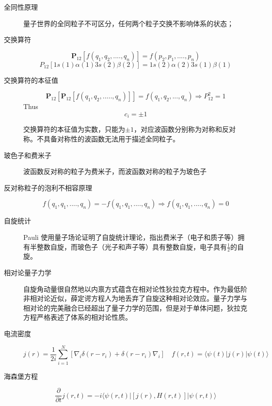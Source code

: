 \documentclass{article}
\numberwithin{equation}{section}
\newcommand{\bracketl}[3]{\langle #1 | #2 | #3 \rangle}
\newcommand{\grad}{\nabla}
\begin{document}
  \begin{description}
  	\item[全同性原理] 量子世界的全同粒子不可区分，任何两个粒子交换不影响体系的状态；

  	\item[交换算符]
  	\begin{equation}
  	\textbf{P}_{12}[f(q_1,q_2,....,q_n)]=f(p_2,p_1,....,p_n)
  	\end{equation}
  	\begin{equation}
  	P_{12}[1s(1)\alpha(1)3s(2)\beta(2)]=1s(2)\alpha(2)3s(1)\beta(1)
  	\end{equation}

  	\item[交换算符的本征值]
  	\begin{equation}
  	\textbf{P}_{12}[\textbf{P}_{12}[f(q_1,q_2,.....,q_n)]]=f(q_1,q_2,...,q_n)\Rightarrow P_{12}^2=1
  	\end{equation}
  	Thus
  	\begin{equation}
  	c_i=\pm 1
  	\end{equation}

  	交换算符的本征值为实数，只能为$\pm 1$，对应波函数分别称为对称和反对称。不具备对称性的波函数无法用于描述全同粒子。

  	\item[玻色子和费米子] 波函数反对称的粒子为费米子，而波函数对称的粒子为玻色子

  	\item[反对称粒子的泡利不相容原理]
  	\begin{equation}
  	f(q_1,q_1,....,q_n)=-f(q_1,q_1,....,q_n) \Rightarrow f(q_1,q_1,....,q_n)=0
  	\end{equation}
  	\item[自旋统计] Pauli 使用量子场论证明了自旋统计理论，指出费米子（电子和质子等）拥有半整数自旋，而玻色子（光子和声子等）具有整数自旋，电子具有$\frac{1}{2}$的自旋。

  	\item[相对论量子力学] 自旋角动量很自然地以内禀方式蕴含在相对论性狄拉克方程中。作为最低阶非相对论近似，薛定谔方程人为地丢弃了自旋这种相对论效应。量子力学与相对论的完美融合已经超出了量子力学的范围，但是对于单体问题，狄拉克方程严格表述了体系的相对论性质。
  \end{description}
  


\begin{description}
	\item[电流密度]
	\begin{equation}
	j(r)=\frac{1}{2i}\sum_{i=1}^{N}[\grad_i\delta(r-r_i)+\delta(r-r_i)\grad_i]\quad f(r,t)=\bracketl{\psi(t)}{j(r)}{\psi(t)}\end{equation}


	 \item[海森堡方程]
	 \begin{equation}
	 \frac{\partial}{\partial t}j(r,t)=-i\bracketl{\psi(r,t)}{[j(r),H(r,t)]}{\psi(r,t)}
	 \end{equation}


\end{description}
\end{document}
